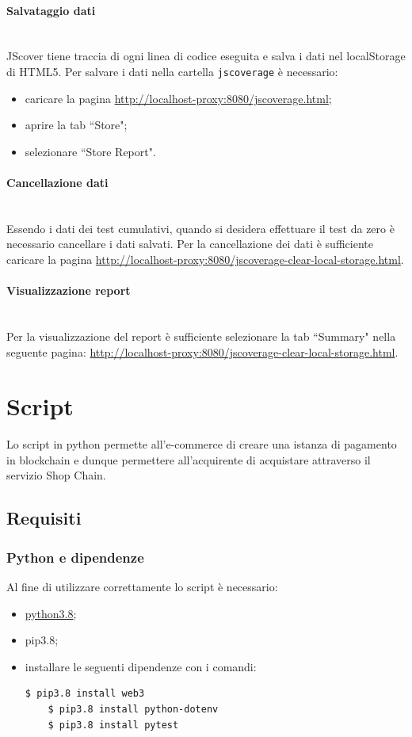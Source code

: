 \documentclass[a4paper, 12pt]{article}
\begin{document}
\paragraph{Salvataggio dati}\\
JScover tiene traccia di ogni linea di codice eseguita e salva i dati nel localStorage di HTML5. Per salvare i dati nella cartella \texttt{jscoverage} è necessario:
\begin{itemize}
  \item caricare la pagina \url{http://localhost-proxy:8080/jscoverage.html};
  \item aprire la tab ``Store";
  \item selezionare ``Store Report".
\end{itemize}
\paragraph{Cancellazione dati}\\
Essendo i dati dei test cumulativi, quando si desidera effettuare il test da zero è necessario cancellare i dati salvati. Per la cancellazione dei dati è sufficiente caricare la pagina \url{http://localhost-proxy:8080/jscoverage-clear-local-storage.html}.
\paragraph{Visualizzazione report}\\
Per la visualizzazione del report è sufficiente selezionare la tab ``Summary" nella seguente pagina:  \url{http://localhost-proxy:8080/jscoverage-clear-local-storage.html}.
\newpage{}
\section{Script}
Lo script in python permette all'e-commerce di creare una istanza di pagamento in blockchain e dunque permettere all'acquirente di acquistare attraverso il servizio Shop Chain.
\subsection{Requisiti}
\subsubsection{Python e dipendenze}
Al fine di utilizzare correttamente lo script è necessario:
\begin{itemize}
  \item \href{https://www.python.org/downloads/}{python3.8};
  \item pip3.8;
  \item installare le seguenti dipendenze con i comandi:
  \begin{lstlisting}[language=bash]
    $ pip3.8 install web3
    $ pip3.8 install python-dotenv
    $ pip3.8 install pytest
  \end{lstlisting}
\end{itemize}
\end{document}
